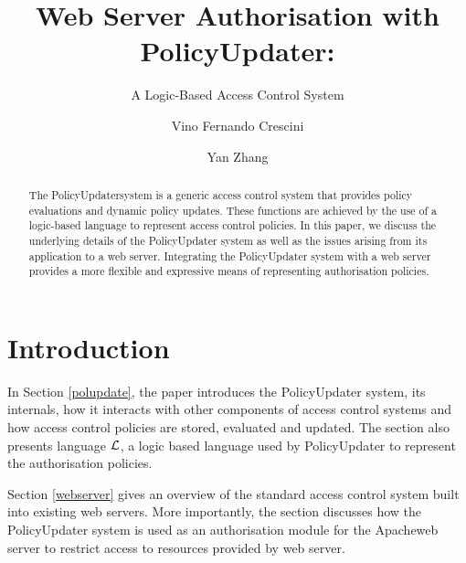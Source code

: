 \documentclass[11pt]{llncs}
\begin{document}
  \title{Web Server Authorisation with PolicyUpdater:}
  \subtitle{A Logic-Based Access Control System}

  \author{Vino Fernando Crescini \and Yan Zhang}


  \maketitle

  \begin{abstract}
    The PolicyUpdater\footnotemark system is a generic access control system
    that provides policy evaluations and dynamic policy updates. These
    functions are achieved by the use of a logic-based language to represent
    access control policies. In this paper, we discuss the underlying details
    of the PolicyUpdater system as well as the issues arising from its
    application to a web server. Integrating the PolicyUpdater system with a
    web server provides a more flexible and expressive means of representing
    authorisation policies.
  \end{abstract}


  \section{Introduction}

    In Section \ref{polupdate}, the paper introduces the PolicyUpdater system,
    its internals, how it interacts with other components of access control
    systems and how access control policies are stored, evaluated and updated.
    The section also presents language ${\cal L}$, a logic based language used
    by PolicyUpdater to represent the authorisation policies.

    Section \ref{webserver} gives an overview of the standard access control
    system built into existing web servers. More importantly, the section
    discusses how the PolicyUpdater system is used as an authorisation module
    for the Apache\footnotemark web server to restrict access to resources
    provided by web server.
\end{document}
